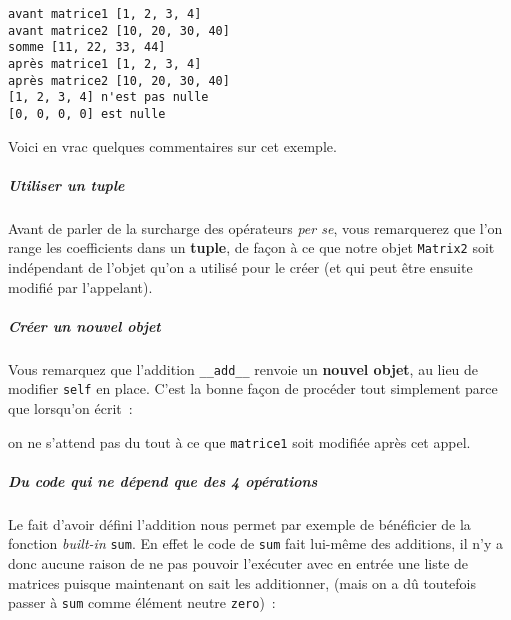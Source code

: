     \begin{Verbatim}[commandchars=\\\{\},frame=single,framerule=0.3mm,rulecolor=\color{cellframecolor}]
avant matrice1 [1, 2, 3, 4]
avant matrice2 [10, 20, 30, 40]
somme [11, 22, 33, 44]
après matrice1 [1, 2, 3, 4]
après matrice2 [10, 20, 30, 40]
[1, 2, 3, 4] n'est pas nulle
[0, 0, 0, 0] est nulle
\end{Verbatim}

    Voici en vrac quelques commentaires sur cet exemple.

    \hypertarget{utiliser-un-tuple}{%
\subparagraph{Utiliser un tuple}\label{utiliser-un-tuple}}

    Avant de parler de la surcharge des opérateurs \emph{per se}, vous
remarquerez que l'on range les coefficients dans un \textbf{tuple}, de
façon à ce que notre objet \texttt{Matrix2} soit indépendant de l'objet
qu'on a utilisé pour le créer (et qui peut être ensuite modifié par
l'appelant).

    \hypertarget{cruxe9er-un-nouvel-objet}{%
\subparagraph{Créer un nouvel objet}\label{cruxe9er-un-nouvel-objet}}

    Vous remarquez que l'addition \texttt{\_\_add\_\_} renvoie un
\textbf{nouvel objet}, au lieu de modifier \texttt{self} en place. C'est
la bonne façon de procéder tout simplement parce que lorsqu'on écrit~:

\begin{Shaded}
\begin{Highlighting}[frame=lines,framerule=0.6mm,rulecolor=\color{asisframecolor}]
\NormalTok{(}\OperatorTok{+}
\end{Highlighting}
\end{Shaded}

on ne s'attend pas du tout à ce que \texttt{matrice1} soit modifiée
après cet appel.

    \hypertarget{du-code-qui-ne-duxe9pend-que-des-4-opuxe9rations}{%
\subparagraph{Du code qui ne dépend que des 4
opérations}\label{du-code-qui-ne-duxe9pend-que-des-4-opuxe9rations}}

    Le fait d'avoir défini l'addition nous permet par exemple de bénéficier
de la fonction \emph{built-in} \texttt{sum}. En effet le code de
\texttt{sum} fait lui-même des additions, il n'y a donc aucune raison de
ne pas pouvoir l'exécuter avec en entrée une liste de matrices puisque
maintenant on sait les additionner, (mais on a dû toutefois passer à
\texttt{sum} comme élément neutre \texttt{zero})~:

